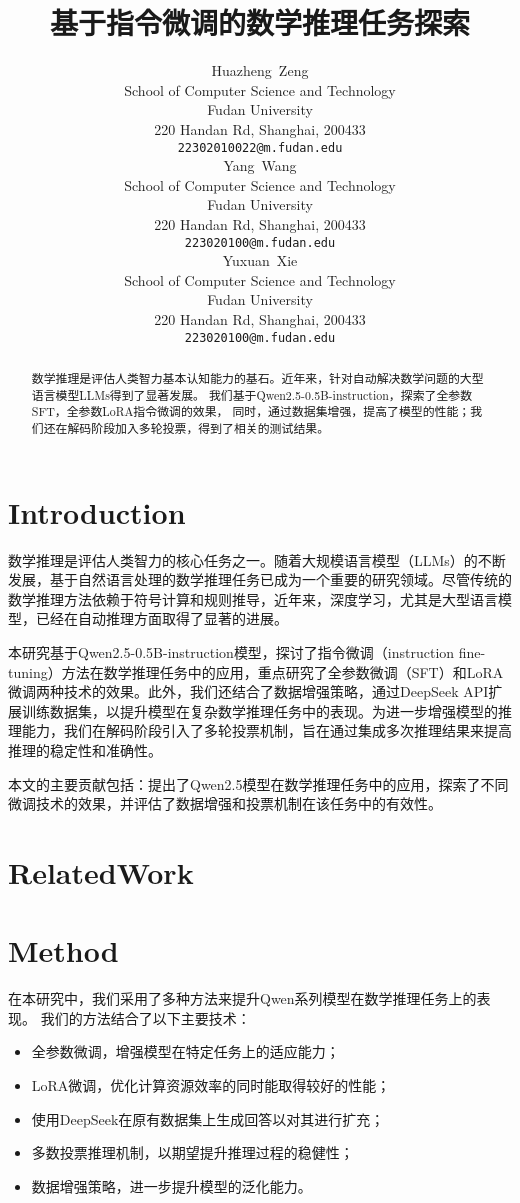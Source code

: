 \documentclass{article}
\title{基于指令微调的数学推理任务探索}
\author{
    Huazheng~Zeng\\
    School of Computer Science and Technology \\
    Fudan University \\
    220 Handan Rd, Shanghai, 200433 \\
    \texttt{22302010022@m.fudan.edu} \\
    \AND
    Yang~Wang\\
    School of Computer Science and Technology \\
    Fudan University \\
    220 Handan Rd, Shanghai, 200433 \\
    \texttt{223020100@m.fudan.edu} \\
    \AND
    Yuxuan~Xie\\
    School of Computer Science and Technology \\
    Fudan University \\
    220 Handan Rd, Shanghai, 200433 \\
    \texttt{223020100@m.fudan.edu} \\
}
\begin{document}
\maketitle


\begin{abstract}
  数学推理是评估人类智力基本认知能力的基石。近年来，针对自动解决数学问题的大型语言模型LLMs得到了显著发展。
  我们基于Qwen2.5-0.5B-instruction，探索了全参数SFT，全参数LoRA指令微调的效果，
  同时，通过数据集增强，提高了模型的性能；我们还在解码阶段加入多轮投票，得到了相关的测试结果。
\end{abstract}



\section{Introduction}

数学推理是评估人类智力的核心任务之一。随着大规模语言模型（LLMs）的不断发展，基于自然语言处理的数学推理任务已成为一个重要的研究领域。尽管传统的数学推理方法依赖于符号计算和规则推导，近年来，深度学习，尤其是大型语言模型，已经在自动推理方面取得了显著的进展。

本研究基于Qwen2.5-0.5B-instruction模型，探讨了指令微调（instruction fine-tuning）方法在数学推理任务中的应用，重点研究了全参数微调（SFT）和LoRA微调两种技术的效果。此外，我们还结合了数据增强策略，通过DeepSeek API扩展训练数据集，以提升模型在复杂数学推理任务中的表现。为进一步增强模型的推理能力，我们在解码阶段引入了多轮投票机制，旨在通过集成多次推理结果来提高推理的稳定性和准确性。

本文的主要贡献包括：提出了Qwen2.5模型在数学推理任务中的应用，探索了不同微调技术的效果，并评估了数据增强和投票机制在该任务中的有效性。






\section{RelatedWork}




\section{Method}


\par 在本研究中，我们采用了多种方法来提升Qwen系列模型在数学推理任务上的表现。
我们的方法结合了以下主要技术：
\begin{itemize}
    \item 全参数微调，增强模型在特定任务上的适应能力；
    \item LoRA微调，优化计算资源效率的同时能取得较好的性能；
    \item 使用DeepSeek在原有数据集上生成回答以对其进行扩充；
    \item 多数投票推理机制，以期望提升推理过程的稳健性；
    \item 数据增强策略，进一步提升模型的泛化能力。
\end{itemize}
 
\end{document}
